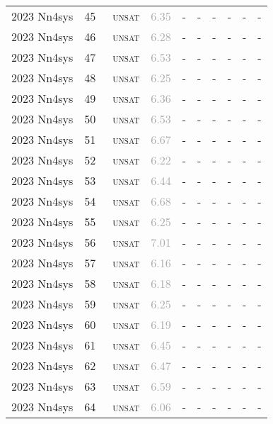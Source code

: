 \begin{center}
{\begin{longtable}{@{}llllllllll@{}}
2023 Nn4sys & 45 & ~\textsc{unsat} & \textcolor{darkgray}{6.35} & - & - & - & - & - & - \\
2023 Nn4sys & 46 & ~\textsc{unsat} & \textcolor{darkgray}{6.28} & - & - & - & - & - & - \\
2023 Nn4sys & 47 & ~\textsc{unsat} & \textcolor{darkgray}{6.53} & - & - & - & - & - & - \\
2023 Nn4sys & 48 & ~\textsc{unsat} & \textcolor{darkgray}{6.25} & - & - & - & - & - & - \\
2023 Nn4sys & 49 & ~\textsc{unsat} & \textcolor{darkgray}{6.36} & - & - & - & - & - & - \\
2023 Nn4sys & 50 & ~\textsc{unsat} & \textcolor{darkgray}{6.53} & - & - & - & - & - & - \\
2023 Nn4sys & 51 & ~\textsc{unsat} & \textcolor{darkgray}{6.67} & - & - & - & - & - & - \\
2023 Nn4sys & 52 & ~\textsc{unsat} & \textcolor{darkgray}{6.22} & - & - & - & - & - & - \\
2023 Nn4sys & 53 & ~\textsc{unsat} & \textcolor{darkgray}{6.44} & - & - & - & - & - & - \\
2023 Nn4sys & 54 & ~\textsc{unsat} & \textcolor{darkgray}{6.68} & - & - & - & - & - & - \\
2023 Nn4sys & 55 & ~\textsc{unsat} & \textcolor{darkgray}{6.25} & - & - & - & - & - & - \\
2023 Nn4sys & 56 & ~\textsc{unsat} & \textcolor{darkgray}{7.01} & - & - & - & - & - & - \\
2023 Nn4sys & 57 & ~\textsc{unsat} & \textcolor{darkgray}{6.16} & - & - & - & - & - & - \\
2023 Nn4sys & 58 & ~\textsc{unsat} & \textcolor{darkgray}{6.18} & - & - & - & - & - & - \\
2023 Nn4sys & 59 & ~\textsc{unsat} & \textcolor{darkgray}{6.25} & - & - & - & - & - & - \\
2023 Nn4sys & 60 & ~\textsc{unsat} & \textcolor{darkgray}{6.19} & - & - & - & - & - & - \\
2023 Nn4sys & 61 & ~\textsc{unsat} & \textcolor{darkgray}{6.45} & - & - & - & - & - & - \\
2023 Nn4sys & 62 & ~\textsc{unsat} & \textcolor{darkgray}{6.47} & - & - & - & - & - & - \\
2023 Nn4sys & 63 & ~\textsc{unsat} & \textcolor{darkgray}{6.59} & - & - & - & - & - & - \\
2023 Nn4sys & 64 & ~\textsc{unsat} & \textcolor{darkgray}{6.06} & - & - & - & - & - & - \\

\end{longtable}}
\end{center}
